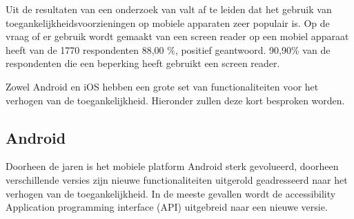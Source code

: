 Uit de resultaten van een onderzoek van \cite{webAIMSurvey} valt af te leiden dat het gebruik van toegankelijkheidsvoorzieningen op mobiele apparaten zeer populair is. Op de vraag of er gebruik wordt gemaakt van een screen reader op een mobiel apparaat heeft van de 1770 respondenten 88,00 \%, positief geantwoord. 90,90\% van de respondenten die een beperking heeft gebruikt een screen reader.


Zowel Android en iOS hebben een grote set van functionaliteiten voor het verhogen van de toegankelijkheid. Hieronder zullen deze kort besproken worden. %
\subsection{Android}
Doorheen de jaren is het mobiele platform Android sterk gevolueerd, doorheen verschillende versies zijn nieuwe functionaliteiten uitgerold geadresseerd naar het verhogen van de toegankelijkheid. In de meeste gevallen wordt de accessibility Application programming interface (API) uitgebreid naar een nieuwe versie.
\label{sec:Android}



